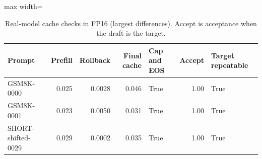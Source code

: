 \begin{table}[!htb]
\centering
\scriptsize
\setlength{\tabcolsep}{3.5pt}
\caption{Real-model cache checks in FP16 (largest differences). Accept is acceptance when the draft is the target.}
\label{tab:t3real}
\begin{adjustbox}{max width=\linewidth}
\begin{tabular}{lrrrlrl}
\toprule
Prompt & Prefill & Rollback & Final cache & Cap and EOS & Accept & Target repeatable \\
\midrule
GSM8K-0000 & 0.025 & 0.0028 & 0.046 & True & 1.00 & True \\
GSM8K-0001 & 0.023 & 0.0050 & 0.031 & True & 1.00 & True \\
SHORT-shifted-0029 & 0.029 & 0.0002 & 0.035 & True & 1.00 & True \\
\bottomrule
\end{tabular}
\end{adjustbox}
\end{table}
